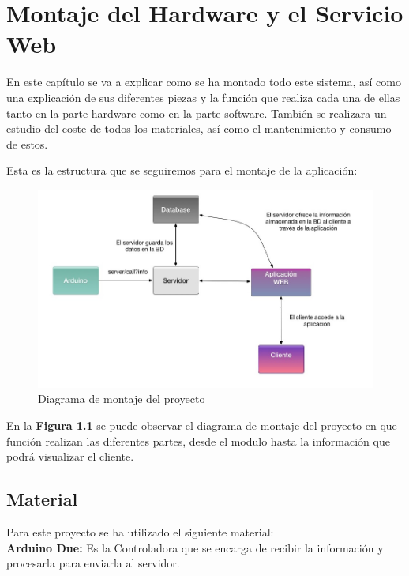 
\chapter{Montaje del Hardware y el Servicio Web}

\setlength{\parindent}{5ex}En este capítulo se va a explicar como se ha montado todo este sistema, así como una explicación de sus diferentes piezas y la función que realiza cada una de ellas tanto en la parte hardware como en la parte software.
También se realizara un estudio del coste de todos los materiales, así como el mantenimiento y consumo de estos.

\setlength{\parindent}{0ex}Esta es la estructura que se seguiremos para el montaje de la aplicación:

\begin{figure}[!h]
	\centering
	\includegraphics[width=1.0\linewidth]{figuras/montage1}
	\caption{Diagrama de montaje del proyecto}
	\label{fig:imgmontage1}
\end{figure}

En la \textbf{Figura \ref{fig:imgmontage1}} se puede observar el diagrama de montaje del proyecto en que función realizan las diferentes partes, desde el modulo hasta la información que podrá visualizar el cliente.
\clearpage

\section{Material}

\setlength{\parindent}{0ex}Para este proyecto se ha utilizado el siguiente material:\\

\textbf{Arduino Due:} Es la Controladora que se encarga de recibir la información y procesarla para enviarla al servidor.

